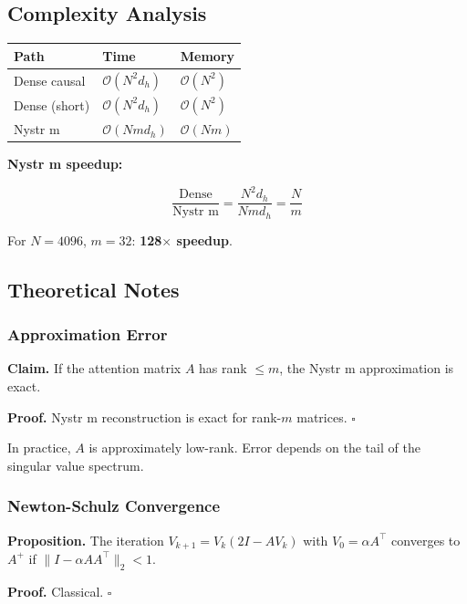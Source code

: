 \subsection{Complexity Analysis}

\begin{table}[H]
\centering
\small
\begin{tabular}{lll}
\toprule
\textbf{Path} & \textbf{Time} & \textbf{Memory} \\
\midrule
Dense causal & $\mathcal{O}(N^2 d_h)$ & $\mathcal{O}(N^2)$ \\
Dense (short) & $\mathcal{O}(N^2 d_h)$ & $\mathcal{O}(N^2)$ \\
Nystr m & $\mathcal{O}(N m d_h)$ & $\mathcal{O}(N m)$ \\
\bottomrule
\end{tabular}
\end{table}

\textbf{Nystr m speedup:}

\[
\frac{\text{Dense}}{\text{Nystr m}} = \frac{N^2 d_h}{N m d_h} = \frac{N}{m}
\tag{4.4}
\]

For $N = 4096$, $m = 32$: \textbf{128$\times$ speedup}.

\subsection{Theoretical Notes}

\subsubsection{Approximation Error}

\textbf{Claim.} If the attention matrix $A$ has rank $\leq m$, the Nystr m 
approximation is exact.

\textbf{Proof.} Nystr m reconstruction is exact for rank-$m$ matrices. $\square$

In practice, $A$ is approximately low-rank. Error depends on the tail of 
the singular value spectrum.

\subsubsection{Newton-Schulz Convergence}

\textbf{Proposition.} The iteration $V_{k+1} = V_k (2I - A V_k)$ with 
$V_0 = \alpha A^\top$ converges to $A^+$ if $\|I - \alpha A A^\top\|_2 < 1$.

\textbf{Proof.} Classical. $\square$

